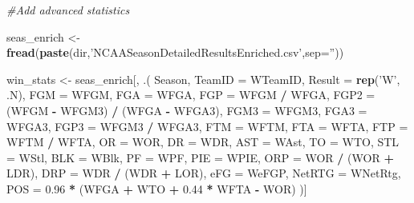\documentclass[]{article}
\newenvironment{Shaded}{\begin{snugshade}}{\end{snugshade}}
\newcommand{\KeywordTok}[1]{\textcolor[rgb]{0.13,0.29,0.53}{\textbf{#1}}}
\newcommand{\DataTypeTok}[1]{\textcolor[rgb]{0.13,0.29,0.53}{#1}}
\newcommand{\FloatTok}[1]{\textcolor[rgb]{0.00,0.00,0.81}{#1}}
\newcommand{\StringTok}[1]{\textcolor[rgb]{0.31,0.60,0.02}{#1}}
\newcommand{\CommentTok}[1]{\textcolor[rgb]{0.56,0.35,0.01}{\textit{#1}}}
\newcommand{\OperatorTok}[1]{\textcolor[rgb]{0.81,0.36,0.00}{\textbf{#1}}}
\newcommand{\NormalTok}[1]{#1}
\begin{document}
\begin{Shaded}
\begin{Highlighting}[]
{{{{{{{{{{{\CommentTok{#Add advanced statistics}

\NormalTok{seas_enrich <-}\StringTok{ }\KeywordTok{fread}\NormalTok{(}\KeywordTok{paste}\NormalTok{(dir,}\StringTok{'NCAASeasonDetailedResultsEnriched.csv'}\NormalTok{,}\DataTypeTok{sep=}\StringTok{''}\NormalTok{))}

\NormalTok{win_stats <-}\StringTok{ }\NormalTok{seas_enrich[, .(}
\NormalTok{  Season,}
  \DataTypeTok{TeamID =}\NormalTok{ WTeamID,}
  \DataTypeTok{Result =} \KeywordTok{rep}\NormalTok{(}\StringTok{'W'}\NormalTok{, .N),}
  \DataTypeTok{FGM =}\NormalTok{ WFGM,}
  \DataTypeTok{FGA =}\NormalTok{ WFGA,}
  \DataTypeTok{FGP =}\NormalTok{ WFGM }\OperatorTok{/}\StringTok{ }\NormalTok{WFGA,}
  \DataTypeTok{FGP2 =}\NormalTok{ (WFGM }\OperatorTok{-}\StringTok{ }\NormalTok{WFGM3) }\OperatorTok{/}\StringTok{ }\NormalTok{(WFGA }\OperatorTok{-}\StringTok{ }\NormalTok{WFGA3),}
  \DataTypeTok{FGM3 =}\NormalTok{ WFGM3,}
  \DataTypeTok{FGA3 =}\NormalTok{ WFGA3,}
  \DataTypeTok{FGP3 =}\NormalTok{ WFGM3 }\OperatorTok{/}\StringTok{ }\NormalTok{WFGA3,}
  \DataTypeTok{FTM =}\NormalTok{ WFTM,}
  \DataTypeTok{FTA =}\NormalTok{ WFTA,}
  \DataTypeTok{FTP =}\NormalTok{ WFTM }\OperatorTok{/}\StringTok{ }\NormalTok{WFTA,}
  \DataTypeTok{OR =}\NormalTok{ WOR,}
  \DataTypeTok{DR =}\NormalTok{ WDR,}
  \DataTypeTok{AST =}\NormalTok{ WAst,}
  \DataTypeTok{TO =}\NormalTok{ WTO,}
  \DataTypeTok{STL =}\NormalTok{ WStl,}
  \DataTypeTok{BLK =}\NormalTok{ WBlk,}
  \DataTypeTok{PF =}\NormalTok{ WPF,}
  \DataTypeTok{PIE =}\NormalTok{ WPIE,}
  \DataTypeTok{ORP =}\NormalTok{ WOR }\OperatorTok{/}\StringTok{ }\NormalTok{(WOR }\OperatorTok{+}\StringTok{ }\NormalTok{LDR),}
  \DataTypeTok{DRP =}\NormalTok{ WDR }\OperatorTok{/}\StringTok{ }\NormalTok{(WDR }\OperatorTok{+}\StringTok{ }\NormalTok{LOR),}
  \DataTypeTok{eFG =}\NormalTok{ WeFGP,}
  \DataTypeTok{NetRTG =}\NormalTok{ WNetRtg,}
  \DataTypeTok{POS =} \FloatTok{0.96} \OperatorTok{*}\StringTok{ }\NormalTok{(WFGA }\OperatorTok{+}\StringTok{ }\NormalTok{WTO }\OperatorTok{+}\StringTok{ }\FloatTok{0.44} \OperatorTok{*}\StringTok{ }\NormalTok{WFTA }\OperatorTok{-}\StringTok{ }\NormalTok{WOR)}
\NormalTok{)]}

}}}}}}}}}}}
\end{Highlighting}
\end{Shaded}
\end{document}
